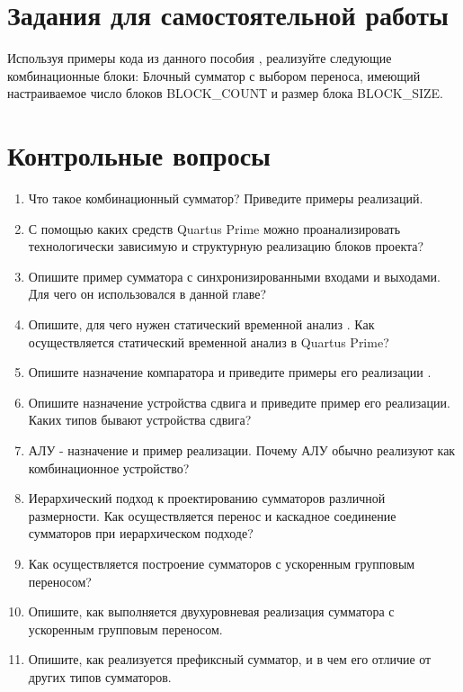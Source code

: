 \documentclass[a4paper,14pt]{article}
\begin{document}
	
	
	\section{Задания для самостоятельной работы}
	
	Используя примеры кода из данного пособия , реализуйте следующие комбинационные
	блоки:
	Блочный сумматор с выбором переноса, имеющий настраиваемое число блоков
	BLOCK\_COUNТ и размер блока BLOCK\_SIZE.
	
	\section{Контрольные вопросы}
	
	\begin{enumerate}
		\item Что такое комбинационный сумматор? Приведите примеры реализаций.
		
		\item С помощью каких средств Quartus Prime можно проанализировать технологически
		зависимую и структурную реализацию блоков проекта?
		
		\item Опишите пример сумматора с синхронизированными входами и выходами. Для чего
		он использовался в данной главе?
		
		\item Опишите, для чего нужен статический временной анализ . Как осуществляется
		статический временной анализ в Quartus Prime?
		
		\item Опишите назначение компаратора и приведите примеры его реализации .
		
		\item Опишите назначение устройства сдвига и приведите пример его реализации. Каких
		типов бывают устройства сдвига?
		
		\item АЛУ - назначение и пример реализации. Почему АЛУ обычно реализуют как
		комбинационное устройство?
		
		\item Иерархический подход к проектированию сумматоров различной размерности. Как
		осуществляется перенос и каскадное соединение сумматоров при иерархическом
		подходе?
		
		\item Как осуществляется построение сумматоров с ускоренным групповым переносом?
		
		\item Опишите, как выполняется двухуровневая реализация сумматора с ускоренным
		групповым переносом.
		
		\item Опишите, как реализуется префиксный сумматор, и в чем его отличие от других типов
		сумматоров.
		
	\end{enumerate}
	
\end{document}
